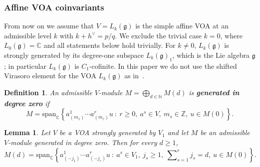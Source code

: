 \documentclass[12pt,a4paper,reqno]{amsart}
\numberwithin{equation}{section}
\newtheorem{lemma}[theorem]{Lemma}
\newtheorem{definition}[theorem]{Definition}
\theoremstyle{definition}
\newcommand{\g}{\mathfrak{g}}
\newcommand{\C}{\mathbb{C}}
\newcommand{\N}{\mathbb{N}}
\newcommand{\Z}{\mathbb{Z}}
\def\spn{\mathrm{span}}
\begin{document}
\subsubsection{Affine VOA coinvariants}
From now on we assume that $V=L_k(\g)$ is the simple affine VOA at an admissible level $k$ with $k+h^\vee=p/q$.
We exclude the trivial case $k=0$, where $L_0(\g)=\C$ and all statements below hold trivially. For $k\neq 0$, $L_k(\g)$ is strongly generated by its degree-one subspace $L_k(\g)_1$, which is the Lie algebra $\g$; in particular $L_k(\g)$ is $C_1$-cofinite. In this paper we do not use the shifted Virasoro element for the VOA $L_k(\g)$ as in~\cite{DLM96}.
\begin{definition}\label{def:bottomgen}
An admissible $V$-module $M=\bigoplus_{d\in \N}M(d)$ is \textbf{generated in degree zero} if
\[
M=\spn_\C\left\{a^1_{(m_1)}\cdots a^r_{(m_r)}u\ :\ r\geq 0,\ a^s\in V,\ m_s\in \Z,\ u\in M(0)\right\}.
\]
\end{definition}

\begin{lemma}\label{lm:bottomgen}
Let $V$ be a VOA strongly generated by $V_1$ and let $M$ be an admissible
$V$-module generated in degree zero. Then for every $d\geq 1$,
\begin{equation}\label{eq:bottomgen}
M(d)=\spn_\C\left\{a^1_{(-j_1)}\cdots a^r_{(-j_r)}u\ :\ a^s\in V_1,\ j_s\geq 1,\ \sum\nolimits_{s=1}^r j_s=d,\ u\in M(0)\right\}.
\end{equation}
\end{lemma}
\end{document}
